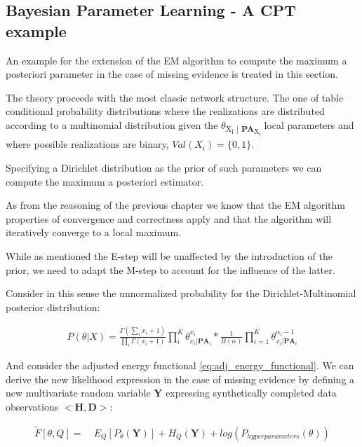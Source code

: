 \documentclass[11pt]{article}
\begin{document}
\begin{article}
\subsection{Bayesian Parameter Learning - A CPT example}
\label{cpt:cpt_bayes_learning}
An example for the extension of the EM algorithm to compute the
maximum a posteriori parameter in the case of missing evidence is
treated in this section.

The theory proceeds with the most classic network structure. The
one of table conditional probability distributions where the
realizations are distributed according to a multinomial
distribution given the \(\theta\)\textsubscript{X\textsubscript{i} | \textbf{PA}\textsubscript{X\textsubscript{i}}} local parameters and
where possible realizations are binary, \(Val(X_i) = \{0,1 \}\).

Specifying a Dirichlet distribution as the prior of such parameters
we can compute the maximum a posteriori estimator.

As from the reasoning of the previous chapter we know that the EM
algorithm properties of convergence and correctness apply and that
the algorithm will iteratively converge to a local maximum.

While as mentioned the E-step will be unaffected by the
introduction of the prior, we need to adapt the M-step to account
for the influence of the latter.

Consider in this sense the unnormalized probability for the
Dirichlet-Multinomial posterior distribution:

\begin{align} \label{eq:dirichlet-multinomial-score}
P(\theta | X) = \frac{\Gamma(\sum_i x_i + 1)}{\prod_i \Gamma(x_i + 1)} \prod_i^K \theta_{x_i | \textbf{PA}_i}^{x_i}  * \frac{1}{B(\alpha)} \prod_{i=1}^K \theta_{x_i | \textbf{PA}_i}^{\alpha_i - 1}
\end{align}

And consider the adjusted energy functional
\ref{eq:adj_energy_functional}. We can derive the new likelihood
expression in the case of missing evidence by defining a new
multivariate random variable \(\textbf{Y}\) expressing synthetically completed data observations \(<\textbf{H},
   \textbf{D}>\):

\begin{align} \label{eq:dirichlet-multinomial-likelihood}
\tilde{F}[\theta, Q] =& \ E_Q[P_\theta(\textbf{Y})] + H_Q (\textbf{Y}) + log(P_{hyperparameters}(\theta))
\end{align}


\end{article}
\end{document}
